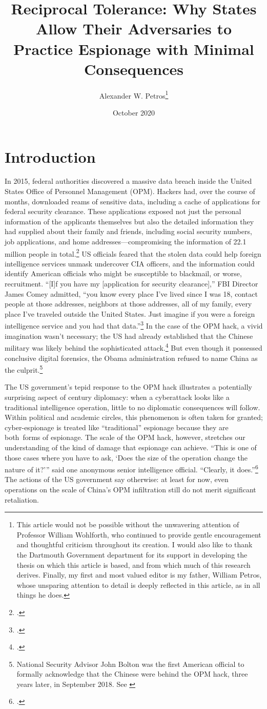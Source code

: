 \documentclass[12pt]{extarticle}
\title{Reciprocal Tolerance: Why States Allow Their Adversaries to Practice Espionage with Minimal Consequences}
\author{Alexander W. Petros\thanks{This article would not be possible without the unwavering attention of Professor William Wohlforth, who continued to provide gentle encouragement and thoughtful criticism throughout its creation. I would also like to thank the Dartmouth Government department for its support in developing the thesis on which this article is based, and from which much of this research derives. Finally, my first and most valued editor is my father, William Petros, whose unsparing attention to detail is deeply reflected in this article, as in all things he does.}}
\date{October 2020}
\begin{document}
\maketitle
\newpage

\newpage
\section{Introduction}
In 2015, federal authorities discovered a massive data breach inside the United States Office of Personnel Management (OPM). Hackers had, over the course of months, downloaded reams of sensitive data, including a cache of applications for federal security clearance. These applications exposed not just the personal information of the applicants themselves but also the detailed information they had supplied about their family and friends, including social security numbers, job applications, and home addresses---compromising the information of 22.1 million people in total.\footcite{nakashima_hacks_2015} US officials feared that the stolen data could help foreign intelligence services unmask undercover CIA officers, and the information could identify American officials who might be susceptible to blackmail, or worse, recruitment. \enquote{[I]f you have my [application for security clearance],} FBI Director James Comey admitted, ``you know every place I've lived since I was 18, contact people at those addresses, neighbors at those addresses, all of my family, every place I've traveled outside the United States. Just imagine if you were a foreign intelligence service and you had that data.''\footcite{nakashima_hacks_2015} In the case of the OPM hack, a vivid imagination wasn't necessary; the US had already established that the Chinese military was likely behind the sophisticated attack.\footcite{koerner_inside_2016} But even though it possessed conclusive digital forensics, the Obama administration refused to name China as the culprit.\footnote{National Security Advisor John Bolton was the first American official to formally acknowledge that the Chinese were behind the OPM hack, three years later, in September 2018. See \cite{sanger_trump_2018}}

The US government's tepid response to the OPM hack illustrates a potentially surprising aspect of  century diplomacy: when a cyberattack looks like a traditional intelligence operation, little to no diplomatic consequences will follow. Within political and academic circles, this phenomenon is often taken for granted; cyber-espionage is treated like \enquote{traditional} espionage because they are both forms of espionage. The scale of the OPM hack, however, stretches our understanding of the kind of damage that espionage can achieve. ``This is one of those cases where you have to ask, `Does the size of the operation change the nature of it?'\thinspace'' said one anonymous senior intelligence official. \enquote{Clearly, it does.}\footcite{sanger_u.s._2015} The actions of the US government say otherwise: at least for now, even operations on the scale of China's OPM infiltration still do not merit significant retaliation.
\end{document}
